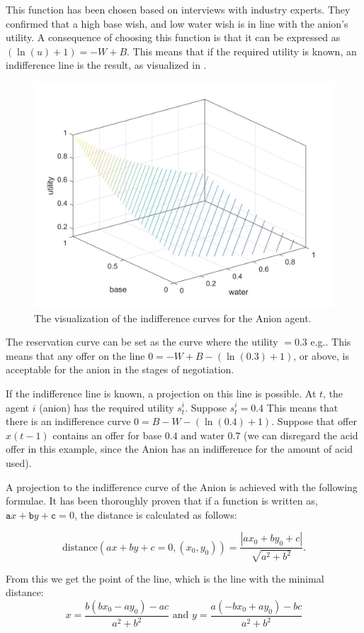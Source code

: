 This function has been chosen based on interviews with industry experts. They confirmed that a high base wish, and low water wish is in line with the anion's utility. A consequence of choosing this function is that it can be expressed as $ (\ln(u)+1) = -W+B$. This means that if the required utility is known, an indifference line is the result, as visualized in .

\begin{figure}[h]
	\centering
	\includegraphics[width=0.7\linewidth]{img/Anion_utility_contour}
	\caption{The visualization of the indifference curves for the Anion agent.}
	\label{fig:anionutilitycontour}
\end{figure}

The reservation curve can be set as the curve where the utility $= 0.3$ e.g.. This means that any offer on the line $0 = - W + B - (\ln(0.3)+1)$, or above, is acceptable for the anion in the stages of negotiation.

If the indifference line is known, a projection on this line is possible. At $t$, the agent $i$ (anion) has the required utility $s^i_t$. Suppose $s^i_t = 0.4$ This means that there is an indifference curve $0 = B - W - (\ln(0.4)+1)$. Suppose that offer $x(t-1)$ contains an offer for base $0.4 \text{ and water } 0.7$ (we can disregard the acid offer in this example, since the Anion has an indifference for the amount of acid used). 

A projection to the indifference curve of the Anion is achieved with the following formulae. It has been thoroughly proven that if a function is written as, $\texttt{a} x + \texttt{b} y + \texttt{c} = 0$, the distance is calculated as follows:

\[\text{distance}(ax+by+c=0, (x_0, y_0)) = \frac{|ax_0+by_0+c|}{\sqrt{a^2+b^2}}. \]

From this we get the point of the line, which is the line with the minimal distance:
\[x = \frac{b(bx_0 - ay_0)-ac}{a^2 + b^2} \text{ and } y = \frac{a(-bx_0 + ay_0) - bc}{a^2+b^2}\]

